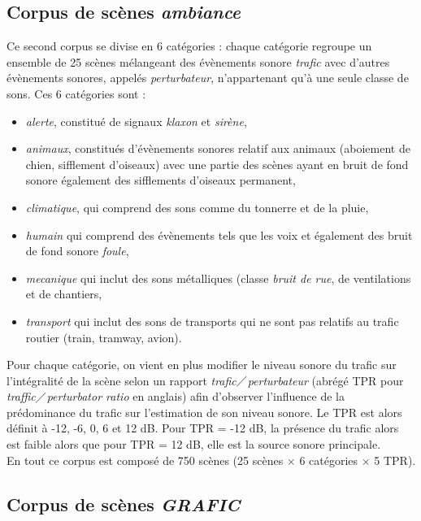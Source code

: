 \subsection{Corpus de scènes \textit{ambiance}}

Ce second corpus se divise en 6 catégories : chaque catégorie regroupe un ensemble de 25 scènes mélangeant des évènements sonore \textit{trafic} avec d'autres évènements sonores,  appelés \textit{perturbateur}, n'appartenant qu'à une seule classe de sons. Ces 6 catégories sont : 

\begin{itemize}
\item \textit{alerte}, constitué de signaux \textit{klaxon} et \textit{sirène},
\item \textit{animaux}, constitués d'évènements sonores relatif aux animaux (aboiement de chien, sifflement d'oiseaux) avec une partie des scènes ayant en bruit de fond sonore également des sifflements d'oiseaux permanent,
\item \textit{climatique}, qui comprend des sons comme du tonnerre et de la pluie,
\item \textit{humain} qui comprend des évènements tels que les voix et également des bruit de fond sonore \textit{foule}, 
\item \textit{mecanique} qui inclut des sons métalliques (classe \textit{bruit de rue}, de ventilations et de chantiers,
\item \textit{transport} qui inclut des sons de transports qui ne sont pas relatifs au trafic routier (train, tramway, avion).\\
\end{itemize}

Pour chaque catégorie, on vient en plus modifier le niveau sonore du trafic sur l'intégralité de la scène selon un rapport \og \textit{trafic}$\diagup$\textit{perturbateur}\fg{} (abrégé TPR pour \textit{traffic}$\diagup$\textit{perturbator ratio} en anglais) afin d'observer l'influence de la prédominance du trafic sur l'estimation de son niveau sonore. Le TPR est alors définit à -12, -6, 0, 6 et 12 dB. Pour TPR = -12 dB, la présence du trafic alors est faible alors que pour TPR = 12 dB, elle est la source sonore principale.\\

En tout ce corpus est composé de 750 scènes (25 scènes $\times$ 6 catégories $\times$ 5 TPR).

\subsection{Corpus de scènes \textit{GRAFIC}} 

